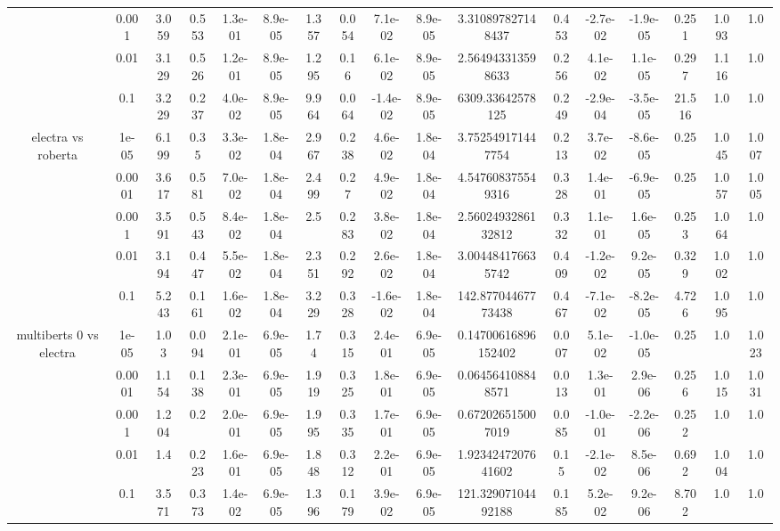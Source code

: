 \begin{tabular}{|c|c|c|c|c|c|c|c|c|c|c|c|c|c|c|c|c|}
 & 0.001 & 3.059 & 0.553 & 1.3e-01 & 8.9e-05 & 1.357 & 0.054 & 7.1e-02 & 8.9e-05 & 3.310897827148437 & 0.453 & -2.7e-02 & -1.9e-05 & 0.251 & 1.093 & 1.0 \\
 & 0.01 & 3.129 & 0.526 & 1.2e-01 & 8.9e-05 & 1.295 & 0.16 & 6.1e-02 & 8.9e-05 & 2.564943313598633 & 0.256 & 4.1e-02 & 1.1e-05 & 0.297 & 1.116 & 1.0 \\
 & 0.1 & 3.229 & 0.237 & 4.0e-02 & 8.9e-05 & 9.964 & 0.064 & -1.4e-02 & 8.9e-05 & 6309.33642578125 & 0.249 & -2.9e-04 & -3.5e-05 & 21.516 & 1.0 & 1.0 \\
\hline
\multirow{5}{*}{electra  vs roberta } & 1e-05 & 6.199 & 0.35 & 3.3e-02 & 1.8e-04 & 2.967 & 0.238 & 4.6e-02 & 1.8e-04 & 3.752549171447754 & 0.213 & 3.7e-02 & -8.6e-05 & 0.25 & 1.045 & 1.007 \\
 & 0.0001 & 3.617 & 0.581 & 7.0e-02 & 1.8e-04 & 2.499 & 0.27 & 4.9e-02 & 1.8e-04 & 4.547608375549316 & 0.328 & 1.4e-01 & -6.9e-05 & 0.25 & 1.057 & 1.005 \\
 & 0.001 & 3.591 & 0.543 & 8.4e-02 & 1.8e-04 & 2.5 & 0.283 & 3.8e-02 & 1.8e-04 & 2.5602493286132812 & 0.332 & 1.1e-01 & 1.6e-05 & 0.253 & 1.064 & 1.0 \\
 & 0.01 & 3.194 & 0.447 & 5.5e-02 & 1.8e-04 & 2.351 & 0.292 & 2.6e-02 & 1.8e-04 & 3.004484176635742 & 0.409 & -1.2e-02 & 9.2e-05 & 0.329 & 1.002 & 1.0 \\
 & 0.1 & 5.243 & 0.161 & 1.6e-02 & 1.8e-04 & 3.229 & 0.328 & -1.6e-02 & 1.8e-04 & 142.87704467773438 & 0.467 & -7.1e-02 & -8.2e-05 & 4.726 & 1.095 & 1.0 \\
\hline
\multirow{5}{*}{multiberts 0 vs electra } & 1e-05 & 1.03 & 0.094 & 2.1e-01 & 6.9e-05 & 1.74 & 0.315 & 2.4e-01 & 6.9e-05 & 0.14700616896152402 & 0.007 & 5.1e-02 & -1.0e-05 & 0.25 & 1.0 & 1.023 \\
 & 0.0001 & 1.154 & 0.138 & 2.3e-01 & 6.9e-05 & 1.919 & 0.325 & 1.8e-01 & 6.9e-05 & 0.064564108848571 & 0.013 & 1.3e-01 & 2.9e-06 & 0.256 & 1.015 & 1.031 \\
 & 0.001 & 1.204 & 0.2 & 2.0e-01 & 6.9e-05 & 1.995 & 0.335 & 1.7e-01 & 6.9e-05 & 0.672026515007019 & 0.085 & -1.0e-01 & -2.2e-06 & 0.252 & 1.0 & 1.0 \\
 & 0.01 & 1.4 & 0.223 & 1.6e-01 & 6.9e-05 & 1.848 & 0.312 & 2.2e-01 & 6.9e-05 & 1.9234247207641602 & 0.15 & -2.1e-02 & 8.5e-06 & 0.692 & 1.004 & 1.0 \\
 & 0.1 & 3.571 & 0.373 & 1.4e-02 & 6.9e-05 & 1.396 & 0.179 & 3.9e-02 & 6.9e-05 & 121.32907104492188 & 0.185 & 5.2e-02 & 9.2e-06 & 8.702 & 1.0 & 1.0 \\

\end{tabular}
